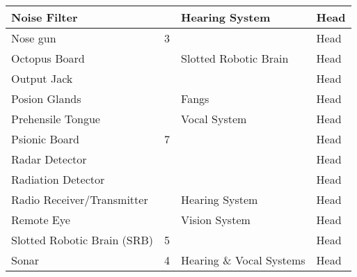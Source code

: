 \documentclass[twoside]{book}
\begin{document}
\begin{longtable}{p{1.25in}p{2em}ll}
  \raggedright
           Noise Filter 
  &
  
  &
   Hearing System 
  &
   Head 
  \tabularnewline
  \hline
      
  \raggedright
           Nose gun 
  &
   3 
  &
  
  &
   Head 
  \tabularnewline
  \hline
      
  \raggedright
           Octopus Board 
  &
  
  &
   Slotted Robotic Brain
           
  &
   Head 
  \tabularnewline
  \hline
      
  \raggedright
           Output Jack 
  &
  
  &
  
  &
   Head 
  \tabularnewline
  \hline
      
  \raggedright
           Posion Glands 
  &
  
  &
   Fangs 
  &
   Head 
  \tabularnewline
  \hline
      
  \raggedright
           Prehensile Tongue 
  &
  
  &
   Vocal System 
  &
   Head 
  \tabularnewline
  \hline
      
  \raggedright
           Psionic Board 
  &
   7 
  &
  
  &
   Head 
  \tabularnewline
  \hline
      
  \raggedright
           Radar Detector 
  &
  
  &
  
  &
   Head 
  \tabularnewline
  \hline
      
  \raggedright
           Radiation Detector 
  &
  
  &
  
  &
   Head 
  \tabularnewline
  \hline
      
  \raggedright
           Radio Receiver/Transmitter
           
  &
  
  &
   Hearing System 
  &
   Head 
  \tabularnewline
  \hline
      
  \raggedright
           Remote Eye 
  &
  
  &
   Vision System 
  &
   Head 
  \tabularnewline
  \hline
      
  \raggedright
           Slotted Robotic Brain (SRB)
           
  &
   5 
  &
  
  &
   Head 
  \tabularnewline
  \hline
      
  \raggedright
           Sonar 
  &
   4 
  &
   Hearing \& Vocal
           Systems 
  &
   Head 
  \tabularnewline
  \hline
      

\end{longtable}
\end{document}
